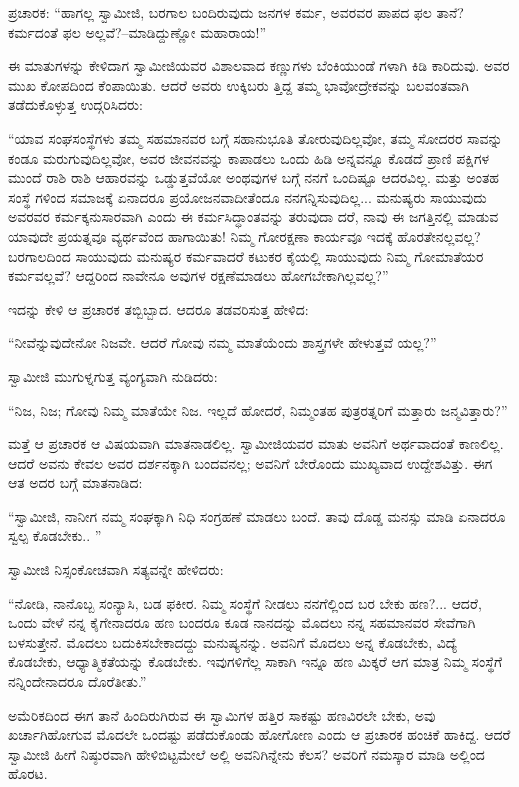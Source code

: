 ಪ್ರಚಾರಕ: “ಹಾಗಲ್ಲ ಸ್ವಾಮೀಜಿ, ಬರಗಾಲ ಬಂದಿರುವುದು ಜನಗಳ ಕರ್ಮ, ಅವರವರ ಪಾಪದ ಫಲ ತಾನೆ? ಕರ್ಮದಂತೆ ಫಲ ಅಲ್ಲವೆ?–ಮಾಡಿದ್ದುಣ್ಣೋ ಮಹಾರಾಯ!”

ಈ ಮಾತುಗಳನ್ನು ಕೇಳಿದಾಗ ಸ್ವಾಮೀಜಿಯವರ ವಿಶಾಲವಾದ ಕಣ್ಣುಗಳು ಬೆಂಕಿಯುಂಡೆ ಗಳಾಗಿ ಕಿಡಿ ಕಾರಿದುವು. ಅವರ ಮುಖ ಕೋಪದಿಂದ ಕೆಂಪಾಯಿತು. ಆದರೆ ಅವರು ಉಕ್ಕಿಬರು ತ್ತಿದ್ದ ತಮ್ಮ ಭಾವೋದ್ರೇಕವನ್ನು ಬಲವಂತವಾಗಿ ತಡೆದುಕೊಳ್ಳುತ್ತ ಉದ್ಗರಿಸಿದರು:

“ಯಾವ ಸಂಘಸಂಸ್ಥೆಗಳು ತಮ್ಮ ಸಹಮಾನವರ ಬಗ್ಗೆ ಸಹಾನುಭೂತಿ ತೋರುವುದಿಲ್ಲವೋ, ತಮ್ಮ ಸೋದರರ ಸಾವನ್ನು ಕಂಡೂ ಮರುಗುವುದಿಲ್ಲವೋ, ಅವರ ಜೀವನವನ್ನು ಕಾಪಾಡಲು ಒಂದು ಹಿಡಿ ಅನ್ನವನ್ನೂ ಕೊಡದೆ ಪ್ರಾಣಿ ಪಕ್ಷಿಗಳ ಮುಂದೆ ರಾಶಿ ರಾಶಿ ಆಹಾರವನ್ನು ಒಡ್ಡುತ್ತವೆಯೋ ಅಂಥವುಗಳ ಬಗ್ಗೆ ನನಗೆ ಒಂದಿಷ್ಟೂ ಆದರವಿಲ್ಲ. ಮತ್ತು ಅಂತಹ ಸಂಸ್ಥೆ ಗಳಿಂದ ಸಮಾಜಕ್ಕೆ ಏನಾದರೂ ಪ್ರಯೋಜನವಾದೀತೆಂದೂ ನನಗನ್ನಿಸುವುದಿಲ್ಲ... ಮನುಷ್ಯರು ಸಾಯುವುದು ಅವರವರ ಕರ್ಮಕ್ಕನುಸಾರವಾಗಿ ಎಂದು ಈ ಕರ್ಮಸಿದ್ಧಾಂತವನ್ನು ತರುವುದಾ ದರೆ, ನಾವು ಈ ಜಗತ್ತಿನಲ್ಲಿ ಮಾಡುವ ಯಾವುದೇ ಪ್ರಯತ್ನವೂ ವ್ಯರ್ಥವೆಂದ ಹಾಗಾಯಿತು! ನಿಮ್ಮ ಗೋರಕ್ಷಣಾ ಕಾರ್ಯವೂ ಇದಕ್ಕೆ ಹೊರತೇನಲ್ಲವಲ್ಲ? ಬರಗಾಲದಿಂದ ಸಾಯುವುದು ಮನುಷ್ಯರ ಕರ್ಮವಾದರೆ ಕಟುಕರ ಕೈಯಲ್ಲಿ ಸಾಯುವುದು ನಿಮ್ಮ ಗೋಮಾತೆಯರ ಕರ್ಮವಲ್ಲವೆ? ಆದ್ದರಿಂದ ನಾವೇನೂ ಅವುಗಳ ರಕ್ಷಣೆಮಾಡಲು ಹೋಗಬೇಕಾಗಿಲ್ಲವಲ್ಲ?”

ಇದನ್ನು ಕೇಳಿ ಆ ಪ್ರಚಾರಕ ತಬ್ಬಿಬ್ಬಾದ. ಆದರೂ ತಡವರಿಸುತ್ತ ಹೇಳಿದ:

“ನೀವೆನ್ನುವುದೇನೋ ನಿಜವೇ. ಆದರೆ ಗೋವು ನಮ್ಮ ಮಾತೆಯೆಂದು ಶಾಸ್ತ್ರಗಳೇ ಹೇಳುತ್ತವೆ ಯಲ್ಲ?”

ಸ್ವಾಮೀಜಿ ಮುಗುಳ್ನಗುತ್ತ ವ್ಯಂಗ್ಯವಾಗಿ ನುಡಿದರು:

“ನಿಜ, ನಿಜ; ಗೋವು ನಿಮ್ಮ ಮಾತೆಯೇ ನಿಜ. ಇಲ್ಲದೆ ಹೋದರೆ, ನಿಮ್ಮಂತಹ ಪುತ್ರರತ್ನರಿಗೆ ಮತ್ತಾರು ಜನ್ಮವಿತ್ತಾರು?”

ಮತ್ತೆ ಆ ಪ್ರಚಾರಕ ಆ ವಿಷಯವಾಗಿ ಮಾತನಾಡಲಿಲ್ಲ. ಸ್ವಾಮೀಜಿಯವರ ಮಾತು ಅವನಿಗೆ ಅರ್ಥವಾದಂತೆ ಕಾಣಲಿಲ್ಲ. ಆದರೆ ಅವನು ಕೇವಲ ಅವರ ದರ್ಶನಕ್ಕಾಗಿ ಬಂದವನಲ್ಲ; ಅವನಿಗೆ ಬೇರೊಂದು ಮುಖ್ಯವಾದ ಉದ್ದೇಶವಿತ್ತು. ಈಗ ಆತ ಅದರ ಬಗ್ಗೆ ಮಾತನಾಡಿದ:

“ಸ್ವಾಮೀಜಿ, ನಾನೀಗ ನಮ್ಮ ಸಂಘಕ್ಕಾಗಿ ನಿಧಿ ಸಂಗ್ರಹಣೆ ಮಾಡಲು ಬಂದೆ. ತಾವು ದೊಡ್ಡ ಮನಸ್ಸು ಮಾಡಿ ಏನಾದರೂ ಸ್ವಲ್ಪ ಕೊಡಬೇಕು.. ”

ಸ್ವಾಮೀಜಿ ನಿಸ್ಸಂಕೋಚವಾಗಿ ಸತ್ಯವನ್ನೇ ಹೇಳಿದರು:

“ನೋಡಿ, ನಾನೊಬ್ಬ ಸಂನ್ಯಾಸಿ, ಬಡ ಫಕೀರ. ನಿಮ್ಮ ಸಂಸ್ಥೆಗೆ ನೀಡಲು ನನಗೆಲ್ಲಿಂದ ಬರ ಬೇಕು ಹಣ?... ಆದರೆ, ಒಂದು ವೇಳೆ ನನ್ನ ಕೈಗೇನಾದರೂ ಹಣ ಬಂದರೂ ಕೂಡ ನಾನದನ್ನು ಮೊದಲು ನನ್ನ ಸಹಮಾನವರ ಸೇವೆಗಾಗಿ ಬಳಸುತ್ತೇನೆ. ಮೊದಲು ಬದುಕಿಸಬೇಕಾದದ್ದು ಮನುಷ್ಯನನ್ನು. ಅವನಿಗೆ ಮೊದಲು ಅನ್ನ ಕೊಡಬೇಕು, ವಿದ್ಯೆ ಕೊಡಬೇಕು, ಆಧ್ಯಾತ್ಮಿಕತೆಯನ್ನು ಕೊಡಬೇಕು. ಇವುಗಳಿಗೆಲ್ಲ ಸಾಕಾಗಿ ಇನ್ನೂ ಹಣ ಮಿಕ್ಕರೆ ಆಗ ಮಾತ್ರ ನಿಮ್ಮ ಸಂಸ್ಥೆಗೆ ನನ್ನಿಂದೇನಾದರೂ ದೊರೆತೀತು.”

ಅಮೆರಿಕದಿಂದ ಈಗ ತಾನೆ ಹಿಂದಿರುಗಿರುವ ಈ ಸ್ವಾಮಿಗಳ ಹತ್ತಿರ ಸಾಕಷ್ಟು ಹಣವಿರಲೇ ಬೇಕು, ಅವು ಖರ್ಚಾಗಿಹೋಗುವ ಮೊದಲೇ ಒಂದಷ್ಟು ಪಡೆದುಕೊಂಡು ಹೋಗೋಣ ಎಂದು ಆ ಪ್ರಚಾರಕ ಹಂಚಿಕೆ ಹಾಕಿದ್ದ. ಆದರೆ ಸ್ವಾಮೀಜಿ ಹೀಗೆ ನಿಷ್ಠುರವಾಗಿ ಹೇಳಿಬಿಟ್ಟಮೇಲೆ ಅಲ್ಲಿ ಅವನಿಗಿನ್ನೇನು ಕೆಲಸ? ಅವರಿಗೆ ನಮಸ್ಕಾರ ಮಾಡಿ ಅಲ್ಲಿಂದ ಹೊರಟ.


